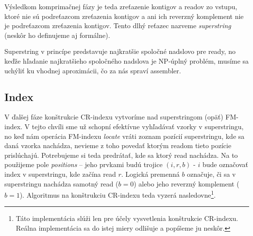 Výsledkom komprimačnej fázy je teda zreťazenie kontigov a readov zo vstupu, ktoré nie sú podreťazcom zreťazenia kontigov a ani ich reverzný komplement nie je podreťazcom zreťazenia kontigov. Tento dlhý reťazec nazveme \emph{superstring} (neskôr ho definujeme aj formálne).

Superstring v princípe predstavuje najkratšie spoločné nadslovo pre ready, no keďže hľadanie najkratšieho spoločného nadslova je NP-úplný problém, musíme sa uchýliť ku vhodnej aproximácii, čo za nás spraví assembler.

\subsection{Index}
\label{ssec:index}
V ďalšej fáze konštrukcie CR-indexu vytvoríme nad superstringom (opäť) FM-index. V tejto chvíli sme už schopní efektívne vyhľadávať vzorky v superstringu, no keď nám operácia FM-indexu \emph{locate} vráti zoznam pozícií superstringu, kde sa daná vzorka nachádza, nevieme z toho povedať ktorým readom tieto pozície prislúchajú. Potrebujeme si teda predrátať, kde sa ktorý read nachádza. Na to použijeme pole \emph{positions} -- jeho prvkami budú trojice $(i, r, b)$ - $i$ bude označovať index v superstringu, kde začína read $r$. Logická premenná $b$ označuje, či sa v superstringu nachádza samotný read ($b=0$) alebo jeho reverzný komplement ($b=1$). Algoritmus na konštrukciu CR-indexu teda vyzerá nasledovne\footnote{Táto implementácia slúži len pre účely vysvetlenia konštrukcie CR-indexu. Reálna implementácia sa do istej miery odlišuje a popíšeme ju neskôr.}.

